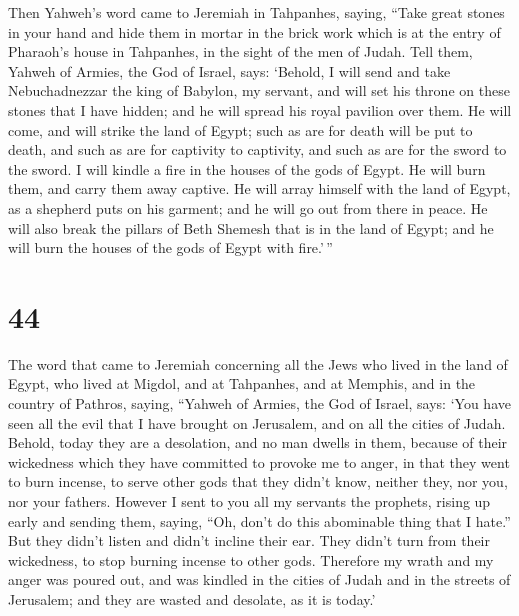  Then Yahweh's word came to Jeremiah in Tahpanhes, saying,
 ``Take great stones in your hand and hide them in mortar in
the brick work which is at the entry of Pharaoh's house in Tahpanhes, in
the sight of the men of Judah.  Tell them, Yahweh of
Armies, the God of Israel, says: `Behold, I will send and take
Nebuchadnezzar the king of Babylon, my servant, and will set his throne
on these stones that I have hidden; and he will spread his royal
pavilion over them.  He will come, and will strike the land
of Egypt; such as are for death will be put to death, and such as are
for captivity to captivity, and such as are for the sword to the sword.
 I will kindle a fire in the houses of the gods of Egypt.
He will burn them, and carry them away captive. He will array himself
with the land of Egypt, as a shepherd puts on his garment; and he will
go out from there in peace.  He will also break the pillars
of Beth Shemesh that is in the land of Egypt; and he will burn the
houses of the gods of Egypt with fire.'\,''

\hypertarget{section-43}{%
\section{44}\label{section-43}}

 The word that came to Jeremiah concerning all the Jews who
lived in the land of Egypt, who lived at Migdol, and at Tahpanhes, and
at Memphis, and in the country of Pathros, saying,  ``Yahweh
of Armies, the God of Israel, says: `You have seen all the evil that I
have brought on Jerusalem, and on all the cities of Judah. Behold, today
they are a desolation, and no man dwells in them,  because
of their wickedness which they have committed to provoke me to anger, in
that they went to burn incense, to serve other gods that they didn't
know, neither they, nor you, nor your fathers.  However I
sent to you all my servants the prophets, rising up early and sending
them, saying, ``Oh, don't do this abominable thing that I hate.''
 But they didn't listen and didn't incline their ear. They
didn't turn from their wickedness, to stop burning incense to other
gods.  Therefore my wrath and my anger was poured out, and
was kindled in the cities of Judah and in the streets of Jerusalem; and
they are wasted and desolate, as it is today.'

